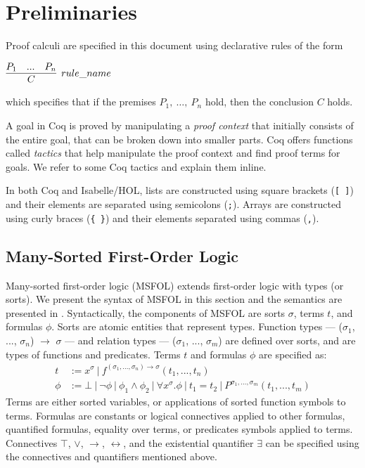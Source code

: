 \documentclass[11pt]{article}
\begin{document}
	\section{Preliminaries}
	\label{sec:prelims}
	Proof calculi are specified in this 
	document using declarative rules of 
	the form
	\begin{center}
		$\infer[rule\_name]{C}{P_1 & ... & P_n}$
	\end{center}
	which specifies that if the premises 
	$P_1,\ \ldots,\ P_n$ hold, then the conclusion $C$
	holds.
	
	A goal in Coq is proved by 
	manipulating a \emph{proof 
	context} that initially consists 
	of the entire goal, that can be 
	broken down into smaller parts. 
	Coq offers functions called 
	\textit{tactics} that help manipulate 
	the proof context and find proof 
	terms for goals. We refer
	to some Coq tactics and 
	explain them inline.
	
	In both Coq and Isabelle/HOL,
	lists are constructed using 
	square brackets (\texttt{[ ]})
	and their elements are separated 
	using semicolons (\texttt{;}). 
	Arrays are constructed using 
	curly braces (\texttt{\{ \}})
	and their elements separated 
	using commas (\texttt{,}). 
	
	\subsection{Many-Sorted First-Order Logic}
	\label{sec:msfol}
	Many-sorted first-order logic (MSFOL)
	extends first-order logic with 
	types (or sorts). We present the 
	syntax of MSFOL in this section and 
	the semantics are presented in
	\cite{Barrett2018}. Syntactically, 
	the components of MSFOL are sorts 
	$\sigma$, terms $t$, and 
	formulas $\phi$. Sorts are 
	atomic entities that 
	represent types. Function types 
	--- ($\sigma_1$, ..., $\sigma_n$) 
	$\to$ $\sigma$ ---
	and relation types 
	--- ($\sigma_1$, ..., $\sigma_m$)
	are defined over sorts, and 
	are types of functions and 
	predicates. Terms $t$ and 
	formulas $\phi$ are specified as:
	\begin{align*}
	t &:= x^{\sigma}\ |\ 
	f^{(\sigma_1, ..., \sigma_n) \to 
		\sigma}	(t_1, ..., t_n)\\
	\phi &:= \bot\ |\ \neg \phi\ |\ 
	\phi_1 \land \phi_2\ |\ \forall 
	x^{\sigma} . \phi\ |\ t_1 = t_2
	\ |\ P^{\sigma_1,...,\sigma_m}
	(t_1, ..., t_m)
	\end{align*}
	Terms are either sorted variables, 
	or applications of sorted function
	symbols to terms.
	Formulas are constants or logical 
	connectives applied to other 
	formulas, quantified formulas, 
	equality over terms, or predicates
	symbols applied to terms. Connectives 
	$\top$, $\lor$, 
	$\to$, $\leftrightarrow$, and the 
	existential	quantifier $\exists$ 
	can be specified using the connectives 
	and quantifiers mentioned above.
	
\end{document}
